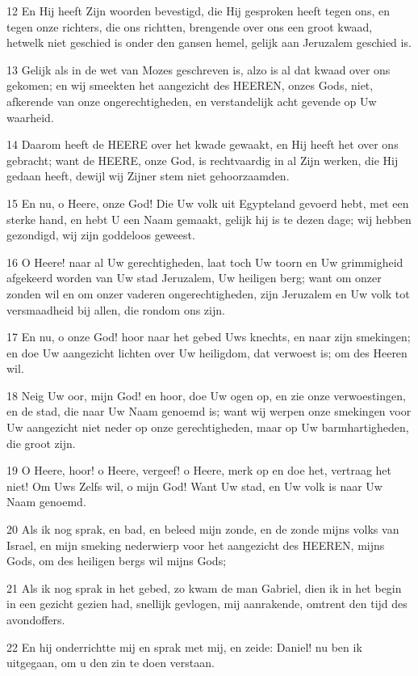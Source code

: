\par 12 En Hij heeft Zijn woorden bevestigd, die Hij gesproken heeft tegen ons, en tegen onze richters, die ons richtten, brengende over ons een groot kwaad, hetwelk niet geschied is onder den gansen hemel, gelijk aan Jeruzalem geschied is.
\par 13 Gelijk als in de wet van Mozes geschreven is, alzo is al dat kwaad over ons gekomen; en wij smeekten het aangezicht des HEEREN, onzes Gods, niet, afkerende van onze ongerechtigheden, en verstandelijk acht gevende op Uw waarheid.
\par 14 Daarom heeft de HEERE over het kwade gewaakt, en Hij heeft het over ons gebracht; want de HEERE, onze God, is rechtvaardig in al Zijn werken, die Hij gedaan heeft, dewijl wij Zijner stem niet gehoorzaamden.
\par 15 En nu, o Heere, onze God! Die Uw volk uit Egypteland gevoerd hebt, met een sterke hand, en hebt U een Naam gemaakt, gelijk hij is te dezen dage; wij hebben gezondigd, wij zijn goddeloos geweest.
\par 16 O Heere! naar al Uw gerechtigheden, laat toch Uw toorn en Uw grimmigheid afgekeerd worden van Uw stad Jeruzalem, Uw heiligen berg; want om onzer zonden wil en om onzer vaderen ongerechtigheden, zijn Jeruzalem en Uw volk tot versmaadheid bij allen, die rondom ons zijn.
\par 17 En nu, o onze God! hoor naar het gebed Uws knechts, en naar zijn smekingen; en doe Uw aangezicht lichten over Uw heiligdom, dat verwoest is; om des Heeren wil.
\par 18 Neig Uw oor, mijn God! en hoor, doe Uw ogen op, en zie onze verwoestingen, en de stad, die naar Uw Naam genoemd is; want wij werpen onze smekingen voor Uw aangezicht niet neder op onze gerechtigheden, maar op Uw barmhartigheden, die groot zijn.
\par 19 O Heere, hoor! o Heere, vergeef! o Heere, merk op en doe het, vertraag het niet! Om Uws Zelfs wil, o mijn God! Want Uw stad, en Uw volk is naar Uw Naam genoemd.
\par 20 Als ik nog sprak, en bad, en beleed mijn zonde, en de zonde mijns volks van Israel, en mijn smeking nederwierp voor het aangezicht des HEEREN, mijns Gods, om des heiligen bergs wil mijns Gods;
\par 21 Als ik nog sprak in het gebed, zo kwam de man Gabriel, dien ik in het begin in een gezicht gezien had, snellijk gevlogen, mij aanrakende, omtrent den tijd des avondoffers.
\par 22 En hij onderrichtte mij en sprak met mij, en zeide: Daniel! nu ben ik uitgegaan, om u den zin te doen verstaan.
